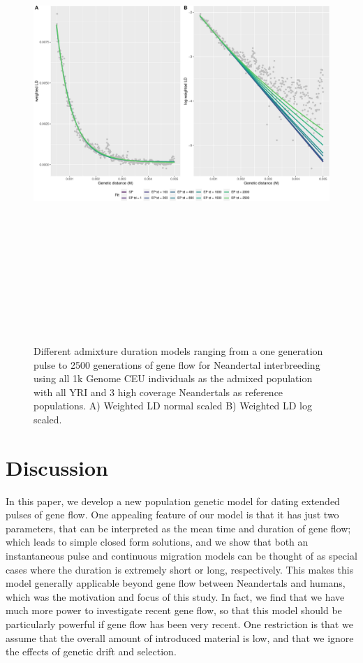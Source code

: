\documentclass[11pt]{article}
\begin{document}
\begin{figure}
\centering
\includegraphics[width=16cm,height=18cm,keepaspectratio]{ATE_Revisions_files/figure-latex/fig5_Real_data-1.pdf}
\caption{\label{fig:fig5} Different admixture duration models ranging
from a one generation pulse to 2500 generations of gene flow for Neandertal interbreeding using all 1k Genome CEU individuals as the admixed population
with all YRI and 3 high coverage Neandertals as reference populations. A) Weighted LD normal scaled B) Weighted LD log scaled.}
\end{figure}

\section{Discussion}\label{discussion}
In this paper, we develop a new population genetic model for dating extended pulses of gene flow. One appealing feature of our model is that it has just two parameters, that can be interpreted as the mean time and duration of gene flow; which leads to simple closed form solutions, and we show that both an instantaneous pulse and continuous migration models can be thought of as special cases where the duration is extremely short or long, respectively. This makes this model generally applicable beyond gene flow between Neandertals and humans, which was the motivation and focus of this study. In fact, we find that we have much more power to investigate recent gene flow, so that this model should be particularly powerful if gene flow has been very recent. One restriction is that we assume that the overall amount of introduced material is low, and that we ignore the effects of genetic drift and selection.
\end{document}
